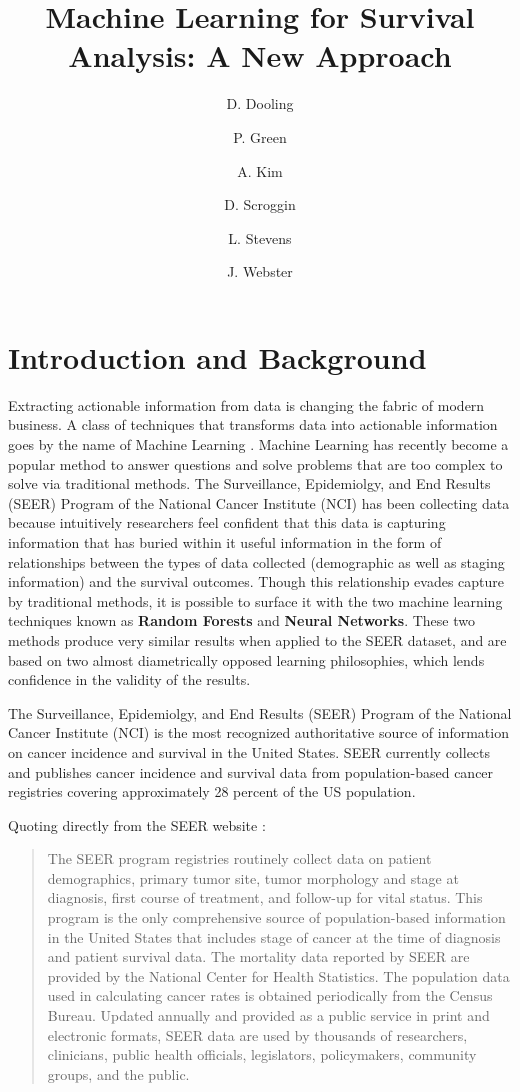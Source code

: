 \documentclass[a4paper,11pt]{article}
\title{Machine Learning for Survival Analysis: A New Approach}
\author{D. Dooling}
\author{P. Green}
\author{A. Kim}
\author{D. Scroggin}
\author{L. Stevens}
\author{J. Webster}
\affiliation{Innovative Oncology Business Solutions, \\
  4901 Lang Ave NE, \\
 Albuquerque, NM 87109, USA}
\begin{document}
 
\maketitle
\flushbottom

\section{Introduction and Background}
\label{sec:intro}



Extracting actionable information from data is changing the fabric of modern business. A class of techniques that transforms data into actionable information goes by the name of Machine Learning \cite{pythonmachinelearning}.
Machine Learning has recently become a popular method to answer questions and solve problems that are too complex to solve via traditional methods. 
The Surveillance, Epidemiolgy, and End Results (SEER) Program of the National Cancer Institute (NCI) has been collecting data because intuitively researchers feel confident that this data is capturing information that has buried within it useful information in the form of  relationships between the types of data collected (demographic as well as staging information) and the survival outcomes.
Though this relationship evades capture by traditional methods, it is possible to surface it with the two machine learning techniques known as \textbf{Random Forests} and \textbf{Neural Networks}. These two methods produce very similar results when applied to the SEER dataset, and are based on two almost diametrically opposed learning philosophies, which lends confidence in the validity of the results.

The Surveillance, Epidemiolgy, and End Results (SEER) Program of the National Cancer Institute (NCI) is the most recognized authoritative source of information on cancer incidence and survival in the United States. SEER currently collects and publishes cancer incidence and survival data from population-based cancer registries covering approximately 28 percent of the US population.

Quoting directly from the SEER
website \citep{seerwebsite}:

\begin{quote}
The SEER program registries routinely collect data on patient demographics, primary tumor site, tumor morphology and stage at diagnosis, first course of treatment, and follow-up for vital status. This program is the only comprehensive source of population-based information in the United States that includes stage of cancer at the time of diagnosis and patient survival data. The mortality data reported by SEER are provided by the National Center for Health Statistics. The population data used in calculating cancer rates is obtained periodically from the Census Bureau. Updated annually and provided as a public service in print and electronic formats, SEER data are used by thousands of researchers, clinicians, public health officials, legislators, policymakers, community groups, and the public.
\end{quote}
\end{document}
